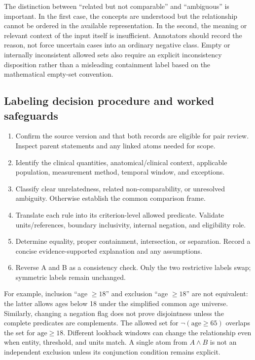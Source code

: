 \documentclass[10pt,letterpaper]{article}
\begin{document}
The distinction between ``related but not comparable'' and ``ambiguous'' is
important. In the first case, the concepts are understood but the relationship
cannot be ordered in the available representation. In the second, the
meaning or relevant context of the input itself is insufficient. Annotators
should record the reason, not force uncertain cases into an ordinary
negative class. Empty or internally inconsistent allowed sets also require
an explicit inconsistency disposition rather than a misleading containment
label based on the mathematical empty-set convention.

\subsection{Labeling decision procedure and worked safeguards}
\begin{enumerate}
\item Confirm the source version and that both records are eligible for pair
review. Inspect parent statements and any linked atoms needed for scope.
\item Identify the clinical quantities, anatomical/clinical context, applicable
population, measurement method, temporal window, and exceptions.
\item Classify clear unrelatedness, related non-comparability, or unresolved
ambiguity. Otherwise establish the common comparison frame.
\item Translate each rule into its criterion-level allowed predicate. Validate
units/references, boundary inclusivity, internal negation, and eligibility role.
\item Determine equality, proper containment, intersection, or separation.
Record a concise evidence-supported explanation and any assumptions.
\item Reverse A and B as a consistency check. Only the two restrictive labels
swap; symmetric labels remain unchanged.
\end{enumerate}

For example, inclusion ``age $\geq18$'' and exclusion ``age $\geq18$'' are
not equivalent: the latter allows ages below 18 under the simplified common
age universe. Similarly, changing a negation flag does not prove disjointness
unless the complete predicates are complements. The allowed set for
$\neg(\mathrm{age}\geq65)$ overlaps the set for $\mathrm{age}\geq18$.
Different lookback windows can change the relationship even when entity,
threshold, and units match. A single atom from $A\land B$ is not an
independent exclusion unless its conjunction condition remains explicit.
\end{document}

